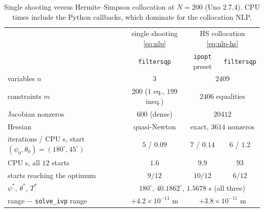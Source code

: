\documentclass[11pt]{article}
\begin{document}
\begin{table}[h]
\centering
\small
\begin{tabular}{lccc}
\toprule
 & single shooting \eqref{eq:nlp} & \multicolumn{2}{c}{HS collocation \eqref{eq:nlp-hs}}\\
 & \texttt{filtersqp} & \texttt{ipopt} preset & \texttt{filtersqp}\\
\midrule
variables $n$ & $3$ & \multicolumn{2}{c}{$2409$}\\
constraints $m$ & $200$ ($1$ eq., $199$ ineq.) & \multicolumn{2}{c}{$2406$ equalities}\\
Jacobian nonzeros & $600$ (dense) & \multicolumn{2}{c}{$20412$}\\
Hessian & quasi-Newton & \multicolumn{2}{c}{exact, $3614$ nonzeros}\\
iterations / CPU s, start $(\psi_0,\theta_0) = (180^\circ,45^\circ)$ & $5$ / $0.09$ & $7$ / $0.14$ & $6$ / $1.2$\\
CPU s, all $12$ starts & $1.6$ & $9.9$ & $93$\\
starts reaching the optimum & $9/12$ & $10/12$ & $6/12$\\
\midrule
$\psi^*$, $\theta^*$, $T^*$ & \multicolumn{3}{c}{$180^\circ$, $40.1862^\circ$, $1.5678$ s (all three)}\\
range $-$ \texttt{solve\_ivp} range & $+4.2\times10^{-11}$ m & \multicolumn{2}{c}{$+3.8\times10^{-11}$ m}\\
\bottomrule
\end{tabular}
\caption{Single shooting versus Hermite--Simpson collocation at $N=200$ (Uno 2.7.4). CPU times
include the Python callbacks, which dominate for the collocation NLP.}\label{tab:cmp}
\end{table}
\end{document}
